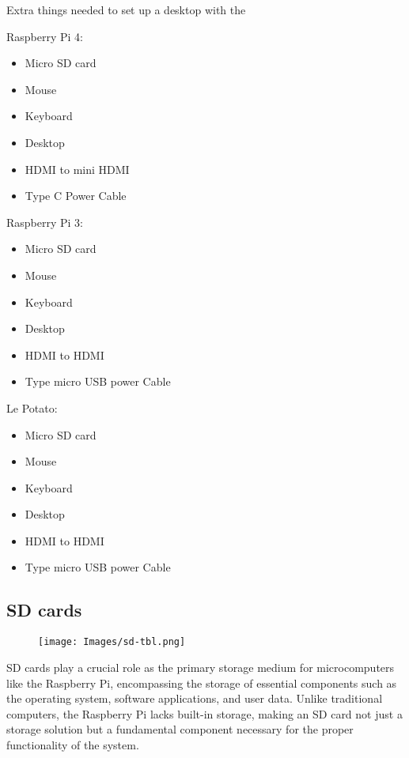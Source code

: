 Extra things needed to set up a desktop with the

Raspberry Pi 4:

\begin{itemize}
\item
  Micro SD card
\item
  Mouse
\item
  Keyboard
\item
  Desktop
\item
  HDMI to mini HDMI
\item
  Type C Power Cable
\end{itemize}

Raspberry Pi 3:

\begin{itemize}
\item
  Micro SD card
\item
  Mouse
\item
  Keyboard
\item
  Desktop
\item
  HDMI to HDMI
\item
  Type micro USB power Cable
\end{itemize}

Le Potato:

\begin{itemize}
\item
  Micro SD card
\item
  Mouse
\item
  Keyboard
\item
  Desktop
\item
  HDMI to HDMI
\item
  Type micro USB power Cable
\end{itemize}

\subsection{SD cards}

\begin{figure}
    \centering
    \texttt{[image: Images/sd-tbl.png]}
\end{figure}

SD cards play a crucial role as the primary storage medium for
microcomputers like the Raspberry Pi, encompassing the storage of
essential components such as the operating system, software
applications, and user data. Unlike traditional computers, the Raspberry
Pi lacks built-in storage, making an SD card not just a storage solution
but a fundamental component necessary for the proper functionality of
the system.

